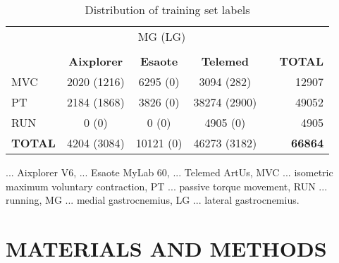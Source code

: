 \documentclass[journal,twoside,web]{ieeecolor}
\begin{document}
 \begin{table}[t]
    \caption{Distribution of training set labels}
    \label{tab:groundtruth}
    \setlength{\tabcolsep}{3pt} \hspace*{-1.3cm} 
    \begin{center}
    \begin{tabular}{lccc c r}
\toprule
        &
        \multicolumn{3}{c}{MG (LG)}
        &
        &
        \\
        \cline{2-4}\\
&\textbf{Aixplorer} 
        &\textbf{Esaote}
        &\textbf{Telemed}
        &
        &\textbf{TOTAL}\\ 
\midrule
        \rule{0pt}{12pt}MVC
        &2020 (1216)
        &6295 (0)
        &3094 (282)
        &
        &12907\\
\rule{0pt}{12pt}PT
        &2184 (1868)
        &3826 (0)
        &38274 (2900)
        &
        &49052\\
\rule{0pt}{12pt}RUN
        &0 (0)
        &0 (0)
        &4905 (0)
        &
        &4905\\
\bottomrule
        \rule{0pt}{12pt}\textbf{TOTAL} 
        &4204 (3084)
        &10121 (0)
        &46273 (3182)
        &
        &\textbf{66864}\\
    \end{tabular}
    \end{center}
        \begin{tablenotes}
        \item  ... Aixplorer V6,  ... Esaote MyLab 60,  ... Telemed ArtUs, MVC ... isometric maximum voluntary contraction, PT ... passive torque movement, RUN ... running, MG ... medial gastrocnemius, LG ... lateral gastrocnemius.\\
    \end{tablenotes}
    \vspace{-0.5cm}
\end{table} 
\section{MATERIALS AND METHODS}
\label{sec:methods}
\end{document}
